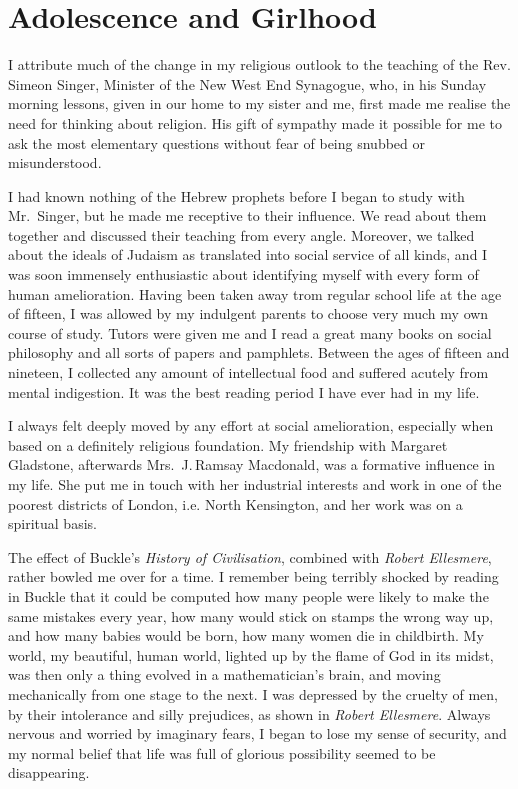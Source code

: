 \chapter{Adolescence and Girlhood}

I attribute much of the change in my religious
outlook to the teaching of the Rev. Simeon Singer,
Minister of the New West End Synagogue, who, in his
Sunday morning lessons, given in our home to my sister
and me, first made me realise the need for thinking about
religion. His gift of sympathy made it possible for me
to ask the most elementary questions without fear of
being snubbed or misunderstood.

I had known nothing of the Hebrew prophets before
I began to study with Mr.\ Singer, but he made me
receptive to their influence. We read about them
together and discussed their teaching from every angle.
Moreover, we talked about the ideals of Judaism as
translated into social service of all kinds, and I was soon
immensely enthusiastic about identifying myself with
every form of human amelioration. Having been taken
away trom regular school life at the age of fifteen, I was
allowed by my indulgent parents to choose very much
my own course of study. Tutors were given me and I
read a great many books on social philosophy and all
sorts of papers and pamphlets. Between the ages of
fifteen and nineteen, I collected any amount of
intellectual food and suffered acutely from mental indigestion.
It was the best reading period I have ever had in my life.

I always felt deeply moved by any effort at social
amelioration, especially when based on a definitely
religious foundation. My friendship with Margaret
Gladstone, afterwards Mrs.\ J.\,Ramsay Macdonald, was
a formative influence in my life. She put me in touch
with her industrial interests and work in one of the
poorest districts of London, i.e. North Kensington, and
her work was on a spiritual basis.

The effect of Buckle’s \textsl{History of Civilisation},
combined with \textsl{Robert Ellesmere}, rather bowled me over
for a time. I remember being terribly shocked by reading
in Buckle that it could be computed how many
people were likely to make the same mistakes
every year, how many would stick on stamps the
wrong way up, and how many babies would be
born, how many women die in childbirth. My
world, my beautiful, human world, lighted up by the
flame of God in its midst, was then only a thing evolved
in a mathematician’s brain, and moving mechanically
from one stage to the next. I was depressed by the
cruelty of men, by their intolerance and silly prejudices,
as shown in \textsl{Robert Ellesmere}. Always nervous and
worried by imaginary fears, I began to lose my sense of
security, and my normal belief that life was full of
glorious possibility seemed to be disappearing.

